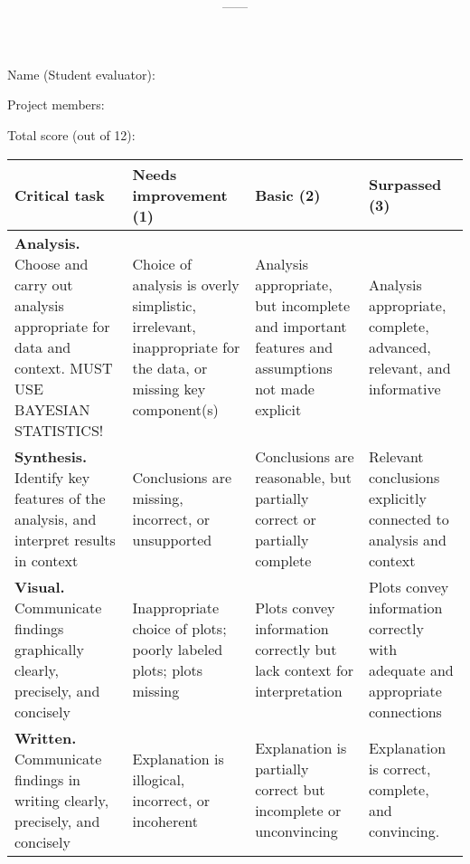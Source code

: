 \documentclass[11pt,onecolumn]{article}
\title{\textbf{\coursename}}
\author{{\semester}---{\roomnumb}---{\classtimes}}
\date{}
\makeatletter
\newcommand{\myname}{A.~Grant Schissler}
\newcommand{\myemail}{aschissler@unr.edu}
\newcommand{\office}{DMSC 224}
\newcommand{\officehours}{Tue 2:30pm-3:30pm, Wed 1:30pm-2:30pm, or by appointment}
\makeatother
\begin{document}



Name (Student evaluator): 

Project members: 

Total score (out of 12): 

\begin{table}[htb]
  \centering
  \begin{tabular}{|p{4.5cm}|p{4.2cm}|p{3.75cm}|p{3.5cm}|}
    \hline
    \bf Critical task & \bf Needs improvement (1) & \bf Basic (2) & \bf Surpassed (3) \\
    \hline
    \hline
    \textbf{Analysis.} Choose and carry out analysis appropriate for data and context. MUST USE BAYESIAN STATISTICS! & Choice of analysis is overly simplistic, irrelevant, inappropriate for the data, or missing key component(s)& Analysis appropriate, but incomplete and important features and assumptions not made explicit & Analysis appropriate, complete, advanced, relevant, and informative\\
    \hline
    \textbf{Synthesis.} Identify key features of the analysis, and interpret results in context & Conclusions are missing, incorrect, or unsupported & Conclusions are reasonable, but partially correct or partially complete & Relevant conclusions explicitly connected to analysis and context\\
    \hline
    \textbf{Visual.} Communicate findings graphically clearly, precisely, and concisely & Inappropriate choice of plots; poorly labeled plots; plots missing & Plots convey information correctly but lack context for interpretation & Plots convey information correctly with adequate and appropriate connections\\
    \hline
    \textbf{Written.} Communicate findings in writing clearly, precisely, and concisely & Explanation is illogical, incorrect, or incoherent & Explanation is partially correct but incomplete or unconvincing & Explanation is correct, complete, and convincing.\\
    \hline
  \end{tabular}
\end{table}
\end{document}

